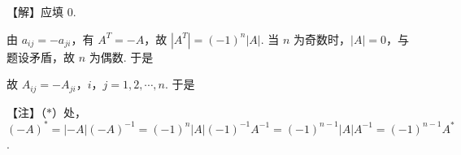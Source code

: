 【解】应填 0.

由 $a_{ij}=-a_{ji}$，有 $A^{T}=-A$，故 $|A^{T}|=(-1)^{n}|A|$. 当 $n$ 为奇数时，$|A|=0$，与题设矛盾，故 $n$ 为偶数. 于是


故 $A_{ij}=-A_{ji}$，$i$，$j=1,2,\cdots,n$. 于是



\begin{fnote}
【注】（$*$）处，$(-A)^*=|-A|(-A)^{-1}=(-1)^{n}|A|(-1)^{-1}A^{-1}=(-1)^{n-1}|A|A^{-1}=(-1)^{n-1}A^*$.
\end{fnote}


